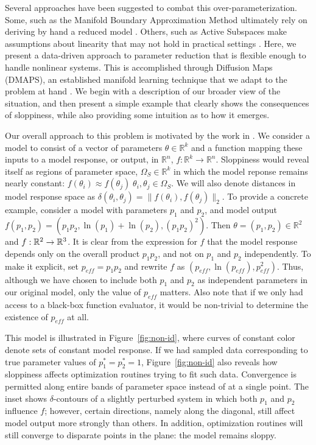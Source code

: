 Several approaches have been suggested to combat this
over-parameterization. Some, such as the Manifold Boundary
Approximation Method ultimately rely on deriving by hand a reduced
model \cite{transtrum_model_2014}. Others, such as
Active Subspaces make assumptions about linearity that may not hold in
practical settings \cite{constantine_active_2015}. Here, we present a
data-driven approach to parameter reduction that is flexible enough to
handle nonlinear systems. This is accomplished through Diffusion Maps
(DMAPS), an established manifold learning technique that we adapt to
the problem at hand \cite{coifman_diffusion_2006}. We begin with a description
of our broader view of the situation, and then present a simple
example that clearly shows the consequences of sloppiness, while also
providing some intuition as to how it emerges.

Our overall approach to this problem is motivated by the work in
\cite{transtrum_geometry_2011}. We consider a model to consist of a vector
of parameters $\theta \in \mathbb{R}^k$ and a function mapping these
inputs to a model response, or output, in $\mathbb{R}^n$,
$f: \mathbb{R}^k \rightarrow \mathbb{R}^n$. Sloppiness would reveal
itself as regions of parameter space, $\Omega_S \in \mathbb{R}^k$ in
which the model reponse remains nearly constant:
$f(\theta_i) \approx f(\theta_j)\; \theta_i, \theta_j \in
\Omega_S$. We will also denote distances in model response space as
$\delta(\theta_i, \theta_j) = \| f(\theta_i), f(\theta_j)\|_2$. To
provide a concrete example, consider a model with parameters $p_1$ and
$p_2$, and model output
$f(p_1, p_2) = (p_1 p_2 , \ln(p_1) + \ln(p_2) , (p_1 p_2)^2)$. Then
$\theta = (p_1, p_2) \in \mathbb{R}^2$ and $f: \mathbb{R}^2 \rightarrow
\mathbb{R}^3$. It is clear from the expression for $f$ that the model response
depends only on the overall product $p_1 p_2$, and not on $p_1$ and
$p_2$ independently. To make it explicit, set $p_{eff} = p_1 p_2$ and
rewrite $f$ as $(p_{eff}, \ln(p_{eff}), p_{eff}^2)$. Thus, although we
have chosen to include both $p_1$ and $p_2$ as independent parameters
in our original model, only the value of $p_{eff}$ matters. Also note
that if we only had access to a black-box function evaluator, it would
be non-trivial to determine the existence of $p_{eff}$ at all.

This model is illustrated in Figure~\ref{fig:non-id}, where curves of
constant color denote sets of constant model response. If we had
sampled data corresponding to true parameter values of
$p_1^* = p_2^* = 1$, Figure~\ref{fig:non-id} also reveals how
sloppiness affects optimization routines trying to fit such
data. Convergence is permitted along entire bands of parameter space
instead of at a single point. The inset shows $\delta$-contours of a
slightly perturbed system in which both $p_1$ and $p_2$ influence $f$;
however, certain directions, namely along the diagonal, still affect
model output more strongly than others. In addition, optimization
routines will still converge to disparate points in the plane: the
model remains sloppy. 

